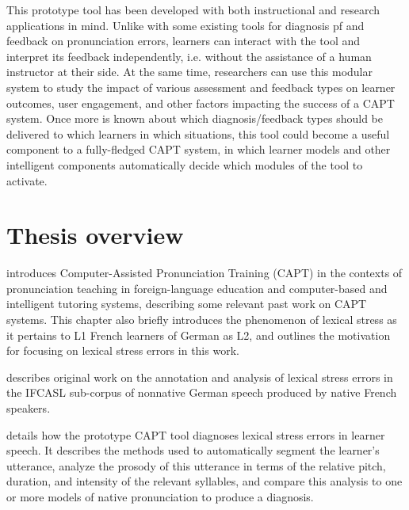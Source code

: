 This prototype tool has been developed with both instructional and research applications in mind.
Unlike with some existing tools for diagnosis pf and feedback on pronunciation errors, learners can interact with the tool and interpret its feedback independently, i.e. without the assistance of a human instructor at their side.
At the same time, researchers can use this modular system to study the impact of various assessment and feedback types on learner outcomes, user engagement, and other factors impacting the success of a CAPT system. 
%
Once more is known about which diagnosis/feedback types should be delivered to which learners in which situations, this tool could become a useful component to a fully-fledged CAPT system, in which learner models and other intelligent components automatically decide which modules of the tool to activate. 



\section{Thesis overview}
\label{sec:intro:overview}


 introduces Computer-Assisted Pronunciation Training (CAPT) in the contexts of pronunciation teaching in foreign-language education and computer-based and intelligent tutoring systems, describing some relevant past work on CAPT systems. This chapter also briefly 
introduces the phenomenon of lexical stress as it pertains to L1 French learners of German as L2, and outlines
the motivation for focusing on lexical stress errors in this work.


describes original work on the annotation and analysis of lexical stress errors in the IFCASL sub-corpus of nonnative German speech produced by native French speakers.

 details how the prototype CAPT tool diagnoses lexical stress errors in learner speech. It describes the methods used to automatically segment the learner's utterance, analyze the prosody of this utterance in terms of the relative pitch, duration, and intensity of the relevant syllables, and compare this analysis to one or more models of native pronunciation to produce a diagnosis.


